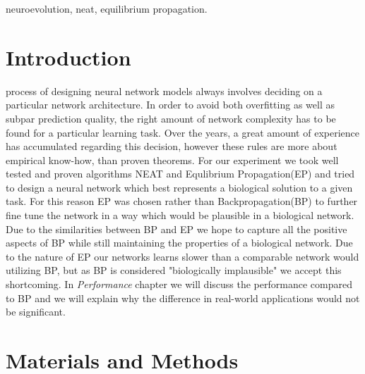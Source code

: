 \documentclass[lettersize,journal]{IEEEtran}
\begin{document}
		
		\begin{IEEEkeywords}
			neuroevolution, neat, equilibrium propagation.
		\end{IEEEkeywords}
		
		\section{Introduction}
		 process of designing neural network models always involves deciding on a particular network architecture. In order to avoid both overfitting as well as subpar prediction quality, the right amount of network complexity has to be found for a particular learning task. Over the years, a great amount of experience has accumulated regarding this decision, however these rules are more about empirical know-how, than proven theorems. For our experiment we took well tested and proven algorithms NEAT and Equlibrium Propagation(EP)\cite{eqprop} and tried to design a neural network which best represents a biological solution to a given task. For this reason EP was chosen rather than Backpropagation(BP)\cite{backprop} to further fine tune the network in a way which would be plausible in a biological network. Due to the similarities between BP and EP we hope to capture all the positive aspects of BP while still maintaining the properties of a biological network. Due to the nature of EP our networks learns slower than a comparable network would utilizing BP, but as BP is considered "biologically implausible" we accept this shortcoming. In \textit{Performance} chapter we will discuss the performance compared to BP and we will explain why the difference in real-world applications would not be significant.
		
		\section{Materials and Methods}
\end{document}
